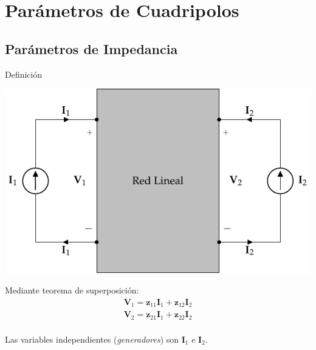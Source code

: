 \documentclass[aspectratio=169, usenames,svgnames,dvipsnames]{beamer}
\begin{document}
\section{Parámetros de Cuadripolos}
\label{sec:org40974f4}
\subsection{Parámetros de Impedancia}
\label{sec:org6cda02a}

\begin{frame}[label={sec:org3bbadbb}]{Definición}
\begin{center}
\includegraphics[height=0.5\textheight]{../figs/cuadripolo_fuentes_corriente.pdf}
\end{center}

Mediante teorema de superposición:
\[
\begin{array}{l}
  \mathbf{V}_1 = \mathbf{z}_{11} \mathbf{I}_1 + \mathbf{z}_{12} \mathbf{I}_2\\
  \mathbf{V}_2 = \mathbf{z}_{21} \mathbf{I}_1 + \mathbf{z}_{22} \mathbf{I}_2\\
\end{array}
\]

Las variables independientes (\emph{generadores}) son \(\mathbf{I}_1\) e \(\mathbf{I}_2\).
\end{frame}
\end{document}
